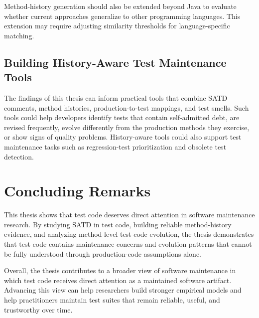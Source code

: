 Method-history generation should also be extended beyond Java to evaluate whether current approaches generalize to other programming languages. This extension may require adjusting similarity thresholds for language-specific matching.

\subsection{Building History-Aware Test Maintenance Tools}

The findings of this thesis can inform practical tools that combine SATD comments, method histories, production-to-test mappings, and test smells. Such tools could help developers identify tests that contain self-admitted debt, are revised frequently, evolve differently from the production methods they exercise, or show signs of quality problems. History-aware tools could also support test maintenance tasks such as regression-test prioritization and obsolete test detection.

\section{Concluding Remarks}

This thesis shows that test code deserves direct attention in software maintenance research. By studying SATD in test code, building reliable method-history evidence, and analyzing method-level test-code evolution, the thesis demonstrates that test code contains maintenance concerns and evolution patterns that cannot be fully understood through production-code assumptions alone.

Overall, the thesis contributes to a broader view of software maintenance in which test code receives direct attention as a maintained software artifact. Advancing this view can help researchers build stronger empirical models and help practitioners maintain test suites that remain reliable, useful, and trustworthy over time.
